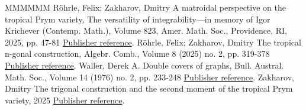 \begin{thebibliography}{MMMMMM}
 Röhrle, Felix; Zakharov, Dmitry A matroidal perspective on the tropical Prym variety, The versatility of integrability—in memory of Igor Krichever (Contemp. Math.), Volume 823, Amer. Math. Soc., Providence, RI, 2025, pp. 47-81 \href{https://alco.centre-mersenne.org/articles/10.5802/alco.452/#RZ_matroidal}{Publisher reference}.
 Röhrle, Felix; Zakharov, Dmitry The tropical n-gonal construction, Algebr. Comb., Volume 8 (2025) no. 2, pp. 319-378 \href{https://alco.centre-mersenne.org/articles/10.5802/alco.452/#RZ_ngonal}{Publisher reference}.
 Waller, Derek A. Double covers of graphs, Bull. Austral. Math. Soc., Volume 14 (1976) no. 2, pp. 233-248 \href{https://alco.centre-mersenne.org/articles/10.5802/alco.452/#Waller_DoubleCoversOfGraphs}{Publisher reference}.
 Zakharov, Dmitry The trigonal construction and the second moment of the tropical Prym variety, 2025 \href{https://alco.centre-mersenne.org/articles/10.5802/alco.452/#Zakharov_Trigonal}{Publisher reference}.
\end{thebibliography}
